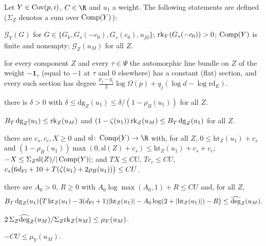 \begin{definition}\label{pf:lift2:def:predY}
Let $Y\in\operatorname{Cov}(p,i)$, $C\in\R$ and $u_1$ a weight. The following statements are defined
($\Sigma_Z$ denotes a sum over $\operatorname{Comp}(Y)$):
\begin{description}[style=unboxed,leftmargin=0pt]
\item[$\lifttwoP{DeepGoodAt}$] $\mathcal G_Y(G)$ for $G\in\{G_k,G_s(-c_0),G_s(c_0),\underline{u_M}\}$;
$\operatorname{rk}_Y(G_s(-c_0))>0$; $\operatorname{Comp}(Y)$ is finite and nonempty; $\mathcal G_Z(u_M)$ for all $Z$.
\item[$\lifttwoP{FlatDegAt}$] for every component $Z$ and every $\tau\in\Psi$ the automorphic line bundle on $Z$ of
the weight $-\mathbf 1_\tau$ (equal to $-1$ at $\tau$ and $0$ elsewhere) has a constant (flat) section,
and every such section has degree $\frac{p_j-q_j}2\log\Omega(p)+q_j(\log d-\log\mathrm{rd}_E)$.
\item[$\lifttwoP{DegAt}(u_1)$] there is $\delta>0$ with $\delta\le\mathrm{dg}_Z(u_1)\le\delta/(1-\rho_B(u_1))$ for
all $Z$.
\item[$\lifttwoP{ShareAt}(u_1)$] $B_T\,\mathrm{dg}_Z(u_1)\le\mathrm{rk}_Z(u_M)$ and
$(1-\zeta(u_1))\,\mathrm{rk}_Z(u_M)\le B_T\,\mathrm{dg}_Z(u_1)$ for all $Z$.
\item[$\lifttwoP{HeightAt}(C,u_1)$] there are $c_s,c_c,X\ge0$ and $\mathrm{sl}\colon\lifttwoComp(Y)\to\R$ with, for
all $Z$, $0\le\mathrm{ht}_Z(u_1)+c_s$ and $(1-\rho_B(u_1))\max(0,\mathrm{sl}(Z)+c_s)\le\mathrm{ht}_Z(u_1)+c_s+c_c$;
$-X\le\Sigma_Z\mathrm{sl}(Z)/|\operatorname{Comp}(Y)|$; and $TX\le CU$, $Tc_c\le CU$,
$c_s\bigl(6d_{\mathrm{Fl}}+10+T(\zeta(u_1)+2\rho_B(u_1))\bigr)\le CU$.
\item[$\lifttwoP{HSAt}(C,u_1)$] there are $A_0>0$, $R\ge0$ with $A_0\log\max(A_0,1)+R\le CU$ and, for all $Z$,
\[
B_T\,\mathrm{dg}_Z(u_1)\bigl(T\,\mathrm{ht}_Z(u_1)-3(d_{\mathrm{Fl}}+1)|\mathrm{ht}_Z(u_1)|-A_0\log(2+|\mathrm{ht}_Z(u_1)|)-R\bigr)
\le\widehat{\operatorname{deg}}_Z(u_M).
\]
\item[$\lifttwoP{SumAt}$] $2\,\Sigma_Z\widehat{\operatorname{deg}}_Z(u_M)/\Sigma_Z\mathrm{rk}_Z(u_M)\le\mu_Y(u_M)$.
\item[$\lifttwoP{UAt}(C)$] $-CU\le\mu_Y(u_M)$.

\end{description}
\end{definition}
